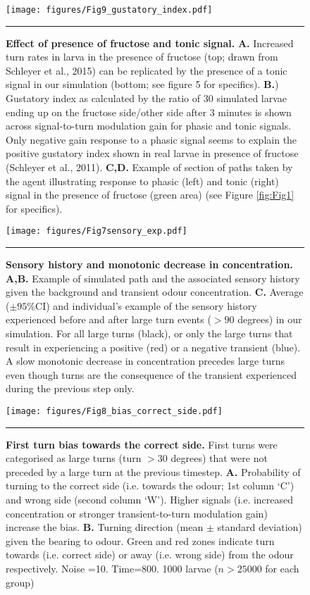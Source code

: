 \documentclass[10pt,a4paper]{article}
\begin{document}
\begin{figure}[!ht]
\begin{center}
\texttt{[image: figures/Fig9\_gustatory\_index.pdf]}
\caption{{\bf Effect of presence of fructose and tonic signal.}
{\bf A.} Increased turn rates in larva in the presence of fructose (top; drawn from Schleyer et al., 2015) can be replicated by the presence of a tonic signal in our simulation (bottom; see figure 5 for specifics).
{\bf B.}) Gustatory index as calculated by the ratio of 30 simulated larvae ending up on the fructose side/other side after 3 minutes is shown across signal-to-turn modulation gain for phasic and tonic signals. Only negative gain response to a phasic signal seems to explain the positive gustatory index shown in real larvae in presence of fructose (Schleyer et al., 2011).
{\bf C,D.} Example of section of paths taken by the agent illustrating response to phasic (left) and tonic (right) signal in the presence of fructose (green area) (see Figure \ref{fig:Fig1} for specifics).
\label{fig:Fig9}}
\hrule
\end{center}
\end{figure}

\begin{figure}[!ht]
\begin{center}
\texttt{[image: figures/Fig7sensory\_exp.pdf]}
\caption{{\bf Sensory history and monotonic decrease in concentration.} {\bf A,B.} Example of simulated path and the associated sensory history given the background and transient odour concentration.
{\bf  C.} Average ($\pm 95\%$CI) and individual’s example of the sensory history experienced before and after large turn events ($>90$ degrees) in our simulation. For all large turns (black), or only the large turns that result in experiencing a positive (red) or a negative transient (blue). A slow monotonic decrease in concentration precedes large turns even though turns are the consequence of the transient experienced during the previous step only.
\label{fig:Fig7}}
\hrule
\end{center}
\end{figure}

\begin{figure}[!ht]
\begin{center}
\texttt{[image: figures/Fig8\_bias\_correct\_side.pdf]}
\caption{{\bf First turn bias towards the correct side.} First turns were categorised as large turns (turn $>30$ degrees) that were not preceded by a large turn at the previous timestep.
{\bf A.} Probability of turning to the correct side (i.e. towards the odour; 1st column ‘C’) and wrong side (second column ‘W’). Higher signals (i.e. increased concentration or stronger transient-to-turn modulation gain) increase the bias.
{\bf B.} Turning direction (mean $\pm$ standard deviation) given the bearing to odour. Green and red zones indicate turn towards (i.e. correct side) or away (i.e. wrong side) from the odour respectively. Noise =10. Time=800. 1000 larvae ($n > 25000$ for each group)
\label{fig:Fig8}}
\hrule
\end{center}
\end{figure}
\end{document}
